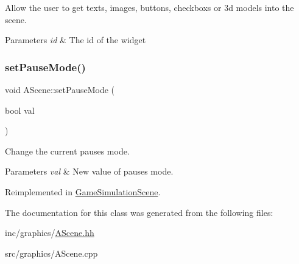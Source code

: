 Allow the user to get texts, images, buttons, checkboxs or 3d models into the scene. 


\begin{DoxyParams}{Parameters}
{\em id} & The id of the widget \\
\hline
\end{DoxyParams}
\mbox{\label{classAScene_a7ff45d7a24796f52d815c00770900339}} 
\subsubsection{\texorpdfstring{set\+Pause\+Mode()}{setPauseMode()}}
{\footnotesize\ttfamily void A\+Scene\+::set\+Pause\+Mode (\begin{DoxyParamCaption}\item[{bool}]{val }\end{DoxyParamCaption})\hspace{0.3cm}{\ttfamily [virtual]}}



Change the current pause\textquotesingle{}s mode. 


\begin{DoxyParams}{Parameters}
{\em val} & New value of pause\textquotesingle{}s mode. \\
\hline
\end{DoxyParams}


Reimplemented in \hyperlink{classGameSimulationScene_a34377bab69b7a81e50f3d2c42596c574}{Game\+Simulation\+Scene}.



The documentation for this class was generated from the following files\+:\begin{DoxyCompactItemize}
\item 
inc/graphics/\hyperlink{AScene_8hh}{A\+Scene.\+hh}\item 
src/graphics/A\+Scene.\+cpp\end{DoxyCompactItemize}
